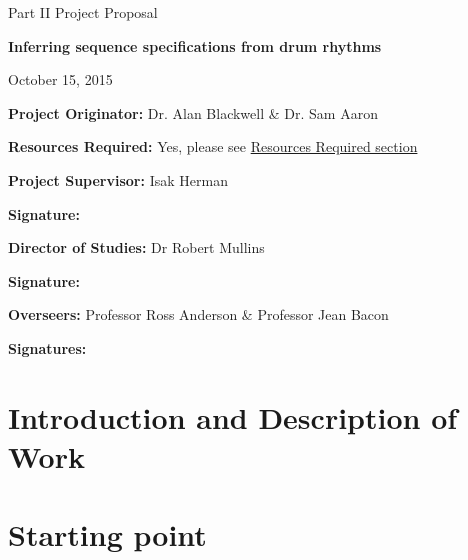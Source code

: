 \documentclass[12pt,a4]{article}
\begin{document}
	\thispagestyle{empty}

	\medskip
	\medskip

	\vfil

	\centerline{\large Part II Project Proposal}
	\vspace{0.4in}
	\centerline{\Large\bf Inferring sequence specifications from drum rhythms}
	\centerline{\large October 15, 2015}

	\vfil

	{\bf Project Originator:} Dr. Alan Blackwell \& Dr. Sam Aaron

	\vspace{0.1in}

	{\bf Resources Required:} Yes, please see \hyperref[sec:Resources]{Resources Required section}

	\vspace{0.5in}

	{\bf Project Supervisor:} Isak Herman

	\vspace{0.2in}

	{\bf Signature:}

	\vspace{0.5in}

	{\bf Director of Studies:} Dr Robert Mullins

	\vspace{0.2in}

	{\bf Signature:}

	\vspace{0.5in}

	{\bf Overseers:} Professor Ross Anderson \& Professor Jean Bacon

	\vspace{0.2in}

	{\bf Signatures:}


	\vfil

	\eject

	\section{Introduction and Description of Work}
	


	\section{Starting point}
	
\end{document}
